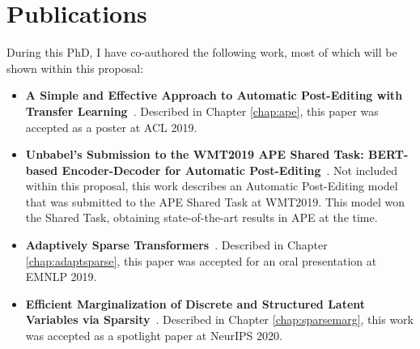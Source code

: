 \section{Publications}
\label{sec:int_publications}

During this PhD, I have co-authored the following work,
most of which will be shown within this proposal:

\begin{itemize}

    \item {\bf A Simple and Effective Approach to Automatic
          Post-Editing with Transfer Learning}~\citep{Correia2019}.
          Described in Chapter \ref{chap:ape}, this paper was accepted as a
          poster at ACL 2019.
          
    \item {\bf Unbabel's Submission to the WMT2019 APE Shared Task:
          BERT-based Encoder-Decoder for Automatic
          Post-Editing}~\citep{lopes2019unbabels}. Not included within this
          proposal, this work describes an Automatic Post-Editing model
          that was submitted to the APE Shared Task at WMT2019. This model
          won the Shared Task, obtaining state-of-the-art results in APE at
          the time.
          
    \item {\bf Adaptively Sparse
          Transformers}~\citep{correia2019adaptively}. Described in Chapter
          \ref{chap:adaptsparse}, this paper was accepted for an oral
          presentation at EMNLP 2019.
          
    \item {\bf Efficient Marginalization of Discrete and Structured
          Latent Variables via Sparsity}~\citep{correia2020procneurips}.
          Described in Chapter \ref{chap:sparsemarg}, this work was
          accepted as a spotlight paper at NeurIPS 2020.
          
\end{itemize}